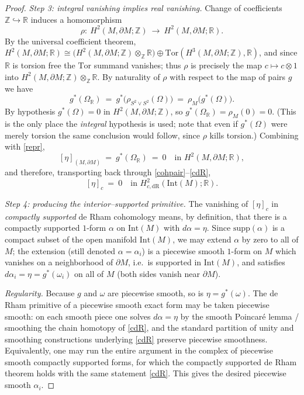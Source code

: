 \documentclass{amsart}
\newtheorem*{theorem 1}{Theorem 1}
\newtheorem*{theorem 2}{Theorem 2}
\newtheorem*{theorem 3}{Theorem 3}
\numberwithin{equation}{section}
\newcommand{\RR}{\mathbb{R}}
\newcommand{\ZZ}{\mathbb{Z}}
\begin{document}
\begin{proof}
\emph{Step 3: integral vanishing implies real vanishing.}  Change of
coefficients $\ZZ\hookrightarrow\RR$ induces a homomorphism
$$ \rho:\ H^2(M,\partial M;\ZZ)\ \longrightarrow\ H^2(M,\partial M;\RR). $$
By the universal coefficient theorem, $H^2(M,\partial M;\RR)\cong
\big(H^2(M,\partial M;\ZZ)\otimes_\ZZ\RR\big)\oplus
\mathrm{Tor}(H^3(M,\partial M;\ZZ),\RR)$, and since $\RR$ is torsion
free the $\mathrm{Tor}$ summand vanishes; thus $\rho$ is precisely the
map $c\mapsto c\otimes 1$ into $H^2(M,\partial M;\ZZ)\otimes_\ZZ\RR$.
By naturality of $\rho$ with respect to the map of pairs $g$ we have
$$ g^*(\Omega_\RR)\ =\ g^*\big(\rho_{S^2\vee S^2}(\Omega)\big)
   \ =\ \rho_M\big(g^*(\Omega)\big). $$
By hypothesis $g^*(\Omega)=0$ in $H^2(M,\partial M;\ZZ)$, so
$g^*(\Omega_\RR)=\rho_M(0)=0$.  (This is the only place the
\emph{integral} hypothesis is used; note that even if $g^*(\Omega)$
were merely torsion the same conclusion would follow, since $\rho$
kills torsion.)  Combining with \eqref{repr},
$$ [\eta]_{(M,\partial M)}\ =\ g^*(\Omega_\RR)\ =\ 0
   \quad\text{in } H^2(M,\partial M;\RR), $$
and therefore, transporting back through \eqref{cohpair}--\eqref{cdR},
$$ [\eta]_c\ =\ 0 \quad\text{in } H^2_{c,\mathrm{dR}}(\mathrm{Int}(M);\RR). $$

\emph{Step 4: producing the interior--supported primitive.}  The
vanishing of $[\eta]_c$ in \emph{compactly supported} de Rham
cohomology means, by definition, that there is a compactly supported
$1$-form $\alpha$ on $\mathrm{Int}(M)$ with $d\alpha=\eta$.  Since
$\mathrm{supp}(\alpha)$ is a compact subset of the open manifold
$\mathrm{Int}(M)$, we may extend $\alpha$ by zero to all of $M$; the
extension (still denoted $\alpha=\alpha_i$) is a piecewise smooth
$1$-form on $M$ which vanishes on a neighborhood of $\partial M$, i.e.\
is supported in $\mathrm{Int}(M)$, and satisfies $d\alpha_i=\eta=
g^*(\omega_i)$ on all of $M$ (both sides vanish near $\partial M$).

\emph{Regularity.}  Because $g$ and $\omega$ are piecewise smooth, so
is $\eta=g^*(\omega)$.  The de Rham primitive of a piecewise smooth
exact form may be taken piecewise smooth: on each smooth piece one
solves $d\alpha=\eta$ by the smooth Poincar\'e lemma / smoothing the
chain homotopy of \eqref{cdR}, and the standard partition of unity and
smoothing constructions underlying \eqref{cdR} preserve piecewise
smoothness.  Equivalently, one may run the entire argument in the
complex of piecewise smooth compactly supported forms, for which the
compactly supported de Rham theorem holds with the same statement
\eqref{cdR}.  This gives the desired piecewise smooth $\alpha_i$.
\end{proof}
\end{document}
